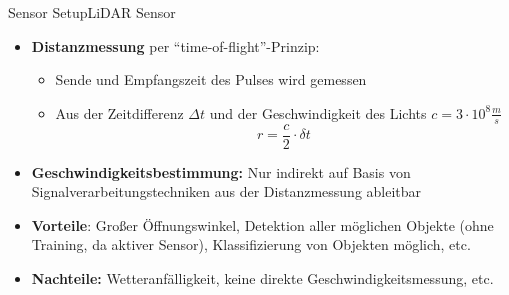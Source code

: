 \documentclass[169, handout	]{THIbeamer} %
\begin{document}
	\begin{frame}{Sensor Setup}{LiDAR Sensor}
		\begin{itemize}
			\item \textbf{Distanzmessung} per \enquote{time-of-flight}-Prinzip:
			\begin{itemize}
				\item Sende und Empfangszeit des Pulses wird gemessen
				\item Aus der Zeitdifferenz $\Delta t$ und der Geschwindigkeit des Lichts $ c = 3 \cdot 10^{8} \frac{m}{s} $
				\begin{equation}
					r = \frac{c}{2} \cdot \delta t
				\end{equation}
			\end{itemize}
			\item \textbf{Geschwindigkeitsbestimmung:} Nur indirekt auf Basis von Signalverarbeitungstechniken aus der Distanzmessung ableitbar
			\item \textbf{Vorteile}: Großer Öffnungswinkel, Detektion aller möglichen Objekte (ohne Training, da aktiver Sensor), Klassifizierung von Objekten möglich, etc.
			\item \textbf{Nachteile:} Wetteranfälligkeit, keine direkte Geschwindigkeitsmessung, etc.
		\end{itemize}
	\end{frame}
\end{document}

